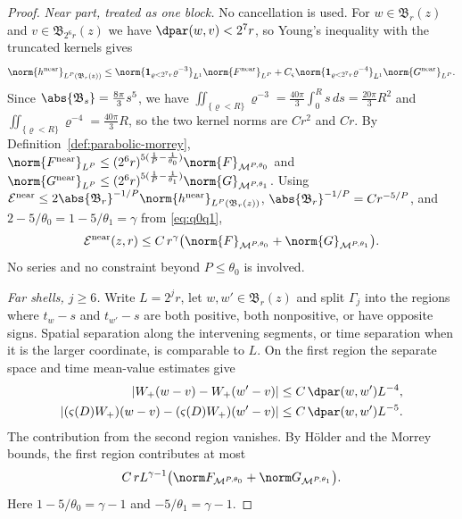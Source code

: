 \documentclass[11pt,reqno]{amsart}
\begin{document}
\begin{proof}
\emph{Near part, treated as one block.} No cancellation is used. For
$w\in\mathfrak{B}_{r}(z)$ and $v\in\mathfrak{B}_{2^{6}r}(z)$ we have
$\dpar(w,v)<2^{7}r$, so Young's inequality with the truncated kernels gives
\[
  \norm{h^{\mathrm{near}}}_{L^{P}(\mathfrak{B}_{r}(z))}
  \le\norm{\mathbf{1}_{\varrho<2^{7}r}\varrho^{-3}}_{L^{1}}
     \norm{F^{\mathrm{near}}}_{L^{P}}
   +C_{\varsigma}\norm{\mathbf{1}_{\varrho<2^{7}r}\varrho^{-4}}_{L^{1}}
     \norm{G^{\mathrm{near}}}_{L^{P}} .
\]
Since $\abs{\mathfrak{B}_{s}}=\tfrac{8\pi}{3}s^{5}$, we have
$\iint_{\{\varrho<R\}}\varrho^{-3}=\tfrac{40\pi}{3}\int_{0}^{R}s\,ds=\tfrac{20\pi}{3}R^{2}$
and $\iint_{\{\varrho<R\}}\varrho^{-4}=\tfrac{40\pi}{3}R$, so the two kernel
norms are $Cr^{2}$ and $Cr$. By Definition~\ref{def:parabolic-morrey},
$\norm{F^{\mathrm{near}}}_{L^{P}}\le(2^{6}r)^{5(\frac1P-\frac1{\theta_{0}})}
 \norm{F}_{\mathcal{M}^{P,\theta_{0}}}$ and
$\norm{G^{\mathrm{near}}}_{L^{P}}\le(2^{6}r)^{5(\frac1P-\frac1{\theta_{1}})}
 \norm{G}_{\mathcal{M}^{P,\theta_{1}}}$. Using
$\mathcal{E}^{\mathrm{near}}\le2\abs{\mathfrak{B}_{r}}^{-1/P}
 \norm{h^{\mathrm{near}}}_{L^{P}(\mathfrak{B}_{r}(z))}$,
$\abs{\mathfrak{B}_{r}}^{-1/P}=Cr^{-5/P}$, and
$2-5/\theta_{0}=1-5/\theta_{1}=\gamma$ from \eqref{eq:q0q1},
\[
  \mathcal{E}^{\mathrm{near}}(z,r)\le
    C\,r^{\gamma}\bigl(\norm{F}_{\mathcal{M}^{P,\theta_{0}}}
      +\norm{G}_{\mathcal{M}^{P,\theta_{1}}}\bigr).
\]
No series and no constraint beyond $P\le\theta_{0}$ is involved.

\emph{Far shells, $j\ge6$.} Write $L=2^jr$, let
$w,w'\in\mathfrak B_r(z)$ and split $\Gamma_j$ into the regions where
$t_w-s$ and $t_{w'}-s$ are both positive, both nonpositive, or have opposite
signs. Spatial separation along the intervening segments, or time separation
when it is the larger coordinate, is comparable to $L$.
On the first region the separate space and time mean-value estimates give
\[
 \begin{aligned}
 |W_+(w-v)-W_+(w'-v)|&\le C\,\dpar(w,w')L^{-4},\\
 |(\varsigma(D)W_+)(w-v)-(\varsigma(D)W_+)(w'-v)|
       &\le C\,\dpar(w,w')L^{-5}.
 \end{aligned}
\]
The contribution from the second region vanishes. By H\"older and the
Morrey bounds, the first region contributes at most
\[
 C\,r L^{\gamma-1}
   \bigl(\norm F_{\mathcal M^{P,\theta_0}}
                   +\norm G_{\mathcal M^{P,\theta_1}}\bigr).
\]
Here $1-5/\theta_0=\gamma-1$ and $-5/\theta_1=\gamma-1$.


\end{proof}
\end{document}
